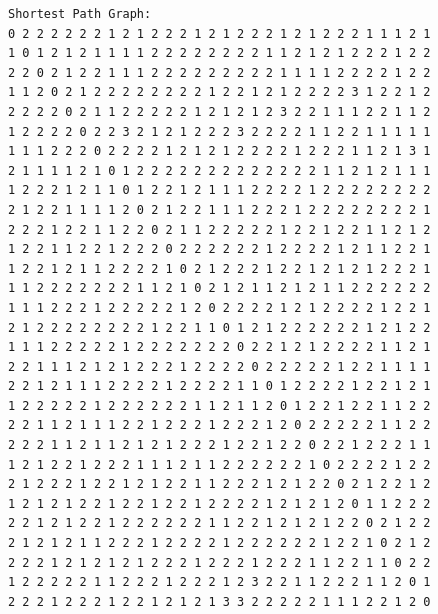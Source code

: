 \documentclass[11pt]{article}
\begin{document}
\begin{lstlisting}
Shortest Path Graph:
0 2 2 2 2 2 2 1 2 1 2 2 2 1 2 1 2 2 2 1 2 1 2 2 2 1 1 1 2 1
1 0 1 2 1 2 1 1 1 1 2 2 2 2 2 2 2 2 1 1 2 1 2 1 2 2 2 1 2 2
2 2 0 2 1 2 2 1 1 1 2 2 2 2 2 2 2 2 2 1 1 1 1 2 2 2 2 1 2 2
1 1 2 0 2 1 2 2 2 2 2 2 2 2 1 2 2 1 2 1 2 2 2 2 3 1 2 2 1 2
2 2 2 2 0 2 1 1 2 2 2 2 2 1 2 1 2 1 2 3 2 2 1 1 1 2 2 1 1 2
1 2 2 2 2 0 2 2 3 2 1 2 1 2 2 2 3 2 2 2 2 1 1 2 2 1 1 1 1 1
1 1 1 2 2 2 0 2 2 2 2 1 2 1 2 1 2 2 2 2 1 2 2 2 1 1 2 1 3 1
2 1 1 1 1 2 1 0 1 2 2 2 2 2 2 2 2 2 2 2 2 2 1 1 2 1 2 1 1 1
1 2 2 2 1 2 1 1 0 1 2 2 1 2 1 1 1 2 2 2 2 1 2 2 2 2 2 2 2 2
2 1 2 2 1 1 1 1 2 0 2 1 2 2 1 1 1 2 2 2 1 2 2 2 2 2 2 2 2 1
2 2 2 1 2 2 1 1 2 2 0 2 1 1 2 2 2 2 2 1 2 2 1 2 2 1 1 2 1 2
1 2 2 1 1 2 2 1 2 2 2 0 2 2 2 2 2 2 1 2 2 2 2 1 2 1 1 2 2 1
1 2 2 1 2 1 1 2 2 2 2 1 0 2 1 2 2 2 1 2 2 1 2 1 2 1 2 2 2 1
1 1 2 2 2 2 2 2 2 1 1 2 1 0 2 1 2 1 1 2 1 2 1 1 2 2 2 2 2 2
1 1 1 2 2 2 1 2 2 2 2 2 1 2 0 2 2 2 2 1 2 1 2 2 2 2 1 2 2 1
2 1 2 2 2 2 2 2 2 2 1 2 2 1 1 0 1 2 1 2 2 2 2 2 2 1 2 1 2 2
1 1 1 2 2 2 2 2 1 2 2 2 2 2 2 2 0 2 2 1 2 1 2 2 2 2 1 1 2 1
2 2 1 1 1 2 1 2 1 2 2 2 1 2 2 2 2 0 2 2 2 2 2 1 2 2 1 1 1 1
2 2 1 2 1 1 1 2 2 2 2 1 2 2 2 2 1 1 0 1 2 2 2 2 1 2 2 1 2 1
1 2 2 2 2 2 1 2 2 2 2 2 2 1 1 2 1 1 2 0 1 2 2 1 2 2 1 1 2 2
2 2 1 1 2 1 1 1 2 2 1 2 2 2 1 2 2 2 1 2 0 2 2 2 2 2 1 1 2 2
2 2 2 1 1 2 1 1 2 1 2 1 2 2 2 1 2 2 1 2 2 0 2 2 1 2 2 2 1 1
1 2 1 2 2 1 2 2 2 1 1 1 2 1 1 2 2 2 2 2 2 1 0 2 2 2 2 1 2 2
2 1 2 2 2 1 2 2 1 2 1 2 2 1 1 2 2 2 1 2 1 2 2 0 2 1 2 2 1 2
1 2 1 2 1 2 2 1 2 2 1 2 2 1 2 2 2 2 1 2 1 2 1 2 0 1 1 2 2 2
2 2 1 2 1 2 2 1 2 2 2 2 2 2 1 1 2 2 1 2 1 2 1 2 2 0 2 1 2 2
2 1 2 1 2 1 1 2 2 2 1 2 2 2 2 1 2 2 2 2 2 2 1 2 2 1 0 2 1 2
2 2 2 1 2 1 2 1 2 1 2 2 2 1 2 2 2 1 2 2 2 1 1 2 2 1 1 0 2 2
1 2 2 2 2 2 1 1 2 2 2 1 2 2 2 1 2 3 2 2 1 1 2 2 2 1 1 2 0 1
2 2 2 1 2 2 2 1 2 2 1 2 1 2 1 3 3 2 2 2 2 2 1 1 1 2 2 1 2 0


\end{lstlisting}
\end{document}
